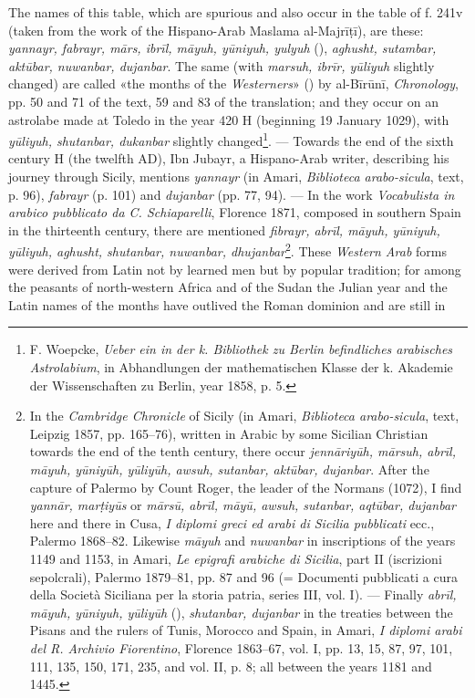 \documentclass[11pt]{article}
\newcommand{\Pg}[1]{\marginpar{\footnotesize\color{gray}#1}}
\begin{document}
\par \Pg{II 202}\Pg{II 203}The names of this table, which are spurious and also occur in the table of f. 241v (taken from the work of the Hispano-Arab Maslama al-Majrīṭī), are these: \emph{yannayr, fabrayr, mārs, ibrīl, māyuh, yūniyuh, yulyuh} (), \emph{aghusht, sutambar, aktūbar, nuwanbar, dujanbar}. The same (with \emph{marsuh, ibrīr, yūliyuh} slightly changed) are called «the months of the \emph{Westerners}» () by al-Bīrūnī, \emph{Chronology}, pp. 50 and 71 of the text, 59 and 83 of the translation; and they occur on an astrolabe made at Toledo in the year 420 H (beginning 19 January 1029), with \emph{yūliyuh, shutanbar, dukanbar} slightly changed\footnote{F. Woepcke, \emph{Ueber ein in der k. Bibliothek zu Berlin befindliches arabisches Astrolabium}, in Abhandlungen der mathematischen Klasse der k. Akademie der Wissenschaften zu Berlin, year 1858, p. 5.}. — Towards the end of the sixth century H (the twelfth AD), Ibn Jubayr, a Hispano-Arab writer, describing his journey through Sicily, mentions \emph{yannayr} (in Amari, \emph{Biblioteca arabo-sicula}, text, p. 96), \emph{fabrayr} (p. 101) and \emph{dujanbar} (pp. 77, 94). — In the work \emph{Vocabulista in arabico pubblicato da C. Schiaparelli}, Florence 1871, composed in southern Spain in the thirteenth century, there are mentioned \emph{fibrayr, abrīl, māyuh, yūniyuh, yūliyuh, aghusht, shutanbar, nuwanbar, dhujanbar}\footnote{In the \emph{Cambridge Chronicle} of Sicily (in Amari, \emph{Biblioteca arabo-sicula}, text, Leipzig 1857, pp. 165–76), written in Arabic by some Sicilian Christian towards the end of the tenth century, there occur \emph{jennāriyūh, mārsuh, abrīl, māyuh, yūniyūh, yūliyūh, awsuh, sutanbar, aktūbar, dujanbar}. After the capture of Palermo by Count Roger, the leader of the Normans (1072), I find \emph{yannār, marṭiyūs} or \emph{mārsū, abrīl, māyū, awsuh, sutanbar, aqtūbar, dujanbar} here and there in Cusa, \emph{I diplomi greci ed arabi di Sicilia pubblicati} ecc., Palermo 1868–82. Likewise \emph{māyuh} and \emph{nuwanbar} in inscriptions of the years 1149 and 1153, in Amari, \emph{Le epigrafi arabiche di Sicilia}, part II (iscrizioni sepolcrali), Palermo 1879–81, pp. 87 and 96 (= Documenti pubblicati a cura della Società Siciliana per la storia patria, series III, vol. I). — Finally \emph{abrīl, māyuh, yūniyuh, yūliyūh} (), \emph{shutanbar, dujanbar} in the treaties between the Pisans and the rulers of Tunis, Morocco and Spain, in Amari, \emph{I diplomi arabi del R. Archivio Fiorentino}, Florence 1863–67, vol. I, pp. 13, 15, 87, 97, 101, 111, 135, 150, 171, 235, and vol. II, p. 8; all between the years 1181 and 1445.}. These \emph{Western Arab} forms were derived from Latin not by learned men but by popular tradition; for among the peasants of north-western Africa and of the Sudan the Julian year and the Latin names of the months have outlived the Roman dominion and are still in 
\end{document}
